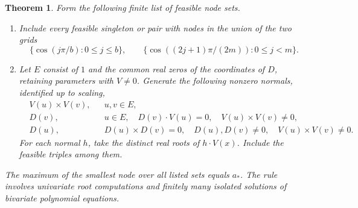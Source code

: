 \documentclass[10pt]{article}
\newtheorem{theorem}{Theorem}
\begin{document}
\begin{theorem}\label{algorithm}
Form the following finite list of feasible node sets.
\begin{enumerate}
\item Include every feasible singleton or pair with nodes in the union of the two grids
\[
 \{\cos(j\pi/b):0\le j\le b\},\qquad
 \{\cos((2j+1)\pi/(2m)):0\le j<m\}.
\]
\item Let $E$ consist of $1$ and the common real zeros of the coordinates of $D$, retaining parameters with $V\ne0$. Generate the following nonzero normals, identified up to scaling,
\begin{align*}
 &V(u)\times V(v), &&u,v\in E,\\
 &D(v), &&u\in E,\quad D(v)\cdot V(u)=0,\quad V(u)\times V(v)\ne0,\\
 &D(u), &&D(u)\times D(v)=0,\quad D(u),D(v)\ne0,\quad V(u)\times V(v)\ne0 .
\end{align*}
For each normal $h$, take the distinct real roots of $h\cdot V(x)$. Include the feasible triples among them.
\end{enumerate}
The maximum of the smallest node over all listed sets equals $a_*$. The rule involves univariate root computations and finitely many isolated solutions of bivariate polynomial equations.
\end{theorem}
\end{document}
